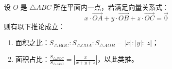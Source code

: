 \begin{statementbox}
设 $O$ 是 $\triangle ABC$ 所在平面内一点，若满足向量关系式：
\[ x \cdot \vec{OA} + y \cdot \vec{OB} + z \cdot \vec{OC} = \vec{0} \]
则有以下推论成立：
\begin{enumerate}
    \item 面积之比：$S_{\triangle BOC} : S_{\triangle COA} : S_{\triangle AOB} = |x| : |y| : |z|$；
    \item 面积占比：$\frac{S_{\triangle BOC}}{S_{\triangle ABC}} = \left| \frac{x}{x+y+z} \right|$，以此类推。
\end{enumerate}
\end{statementbox}